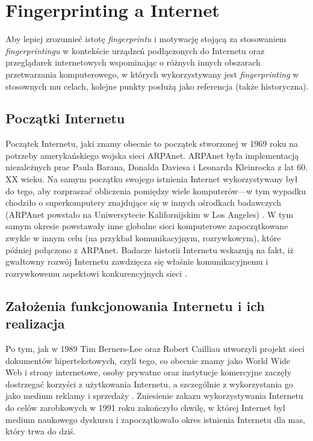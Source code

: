 \section{Fingerprinting a Internet} %
Aby lepiej zrozumieć istotę \emph{fingerprintu} i motywację stojącą za
stosowaniem \emph{fingerprintingu} w kontekście urządzeń podłączonych do
Internetu oraz przeglądarek internetowych wspominając o różnych innych obszarach
przetwarzania komputerowego, w których wykorzystywany jest \emph{fingerprinting}
w stosownych mu celach, kolejne punkty posłużą jako referencja (także
historyczna).

\subsection{Początki Internetu}
Początek Internetu, jaki znamy obecnie to początek stworzonej w 1969 roku na
potrzeby amerykańskiego wojska sieci ARPAnet. ARPAnet była implementacją
niezależnych prac Paula Barana, Donalda Daviesa i Leonarda Kleinrocka z lat 60.
XX wieku. Na samym początku swojego istnienia Internet wykorzystywany był do
tego, aby rozpraszać obliczenia pomiędzy wiele komputerów---w tym wypadku
chodziło o superkomputery znajdujące się w innych ośrodkach badawczych (ARPAnet
powstało na Uniwersytecie Kalifornijskim w Los Angeles) \cite{press2015very}. W
tym samym okresie powstawały inne globalne sieci komputerowe zapoczątkowane
zwykle w innym celu (na przykład komunikacyjnym, rozrywkowym), które później
połączono z ARPAnet. Badacze historii Internetu wskazują na fakt, iż gwałtowny
rozwój Internetu zawdzięcza się właśnie komunikacyjnemu i rozrywkowemu aspektowi
konkurencyjnych sieci \cite{maigret2012socjologia}.

\subsection{Założenia funkcjonowania Internetu i ich realizacja}
Po tym, jak w 1989 Tim Berners-Lee oraz Robert Cailliau utworzyli projekt sieci
dokumentów hipertekstowych, czyli tego, co obecnie znamy jako World Wide Web i
strony internetowe, osoby prywatne oraz instytucje komercyjne zaczęły dostrzegać
korzyści z użytkowania Internetu, a szczególnie z wykorzystania go jako medium
reklamy i sprzedaży \cite{press2015very}. Zniesienie zakazu wykorzystywania
Internetu do celów zarobkowych w 1991 roku zakończyło chwilę, w której Internet
był medium naukowego dyskursu i zapoczątkowało okres istnienia Internetu dla
mas, który trwa do dziś.

